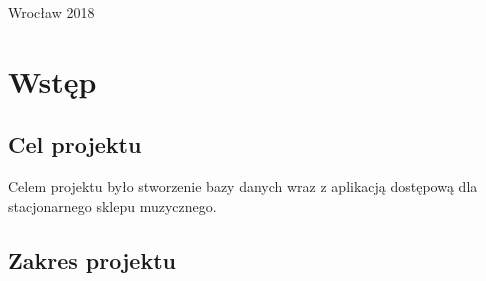 \begin{titlepage}




 

\vfill %

{\large Wrocław 2018}

\end{titlepage}

\section{Wstęp}
\subsection{Cel projektu}

Celem projektu było stworzenie bazy danych wraz z aplikacją dostępową dla stacjonarnego sklepu muzycznego.

\subsection{Zakres projektu}

